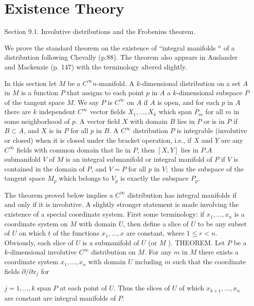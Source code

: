 \documentclass[10pt]{article}
\begin{document}
\section{Existence Theory}
Section 9.1. Involutive distributions and the Frobenius theorem.

We prove the standard theorem on the existence of “integral manifolds ${ }^{n}$ of a distribution following Chevally (p.88). The theorem also appears in Auslander and Mackenzie (p. 147) with the terminology altered slightly.

In this section let $M$ be a $C^{\infty} n$-manifold. A $k$-dimensional distribution on a set $A$ in $M$ is a function $P$ that assigns to each point $p$ in $A$ a $k$-dimensional subspace $P$ of the tangent space $M$. We say $P$ is $C^{\infty}$ on $A$ if $A$ is open, and for each $p$ in $A$ there are $k$ independent $C^{\infty}$ vector fields $X_{1}, \ldots, X_{k}$ which span $P_{m}$ for all $m$ in some neighborhood of $p$. A vector field $X$ with domain $B$ lies in $P$ or is in $P$ if $B \subset A$, and $X$ is in $P$ for all $p$ in $B$. A $C^{\infty}$ distribution $P$ is integrable (involutive or closed) when it is closed under the bracket operation, i.e., if $X$ and $Y$ are any $C^{\infty}$ fields with common domain that lie in $P$, then $[X, Y]$ lies in $P . A$ submanifold $V$ of $M$ is an integral submanifold or integral manifold of $P$ if $V$ is contained in the domain of $P$, and $V=P$ for all $p$ in $V ;$ thus the subspace of the tangent space $M_{p}$ which belongs to $V_{p}$ is exactly the subspace $P_{p}$.

The theorem proved below implies a $C^{\infty}$ distribution has integral manifolds if and only if it is involutive. A slightly stronger statement is made involving the existence of a special coordinate system. First some terminology: if $x_{1}, \ldots, x_{n}$ is a coordinate system on $M$ with domain $U$, then define a slice of $U$ to be any subset of $U$ on which $t$ of the functions $x_{1}, \ldots, x$ are constant, where $1 \leqslant r<n$. Obviously, each slice of $U$ is a submanifold of $U$ (or $M$ ). THEOREM. Let $P$ be a $k$-dimensional involutive $C^{\infty}$ distribution on $M$. For any $m$ in $M$ there exists a coordinate system $x_{1}, \ldots, x_{n}$ with domain $U$ including $m$ such that the coordinate fields $\partial / \partial x_{j}$ for

$j=1, \ldots, k$ span $P$ at each point of $U$. Thus the slices of $U$ of which $x_{k+1}, \ldots, x_{n}$ are constant are integral manifolds of $P$.
\end{document}

